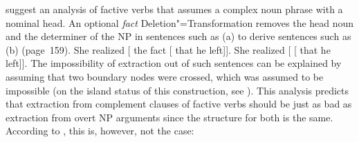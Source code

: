 \noindent
\citet{KK70a} suggest an analysis of factive verbs that assumes a complex noun phrase with a nominal head. An optional
\emph{fact} Deletion"=Transformation removes the head noun and the determiner of the
NP in sentences such as (a) to derive sentences such as (b) (page~159). 
\eal
\ex She realized [ the fact [ that he left]].
\ex She realized [ [ that he left]].
\zl
\addlines
The impossibility of extraction out of such sentences can be explained by assuming that two boundary
nodes were crossed, which was assumed to be impossible (on
the island status of this construction, see \citealp[Section~4]{KK70a}). This analysis predicts that
extraction from complement clauses of factive verbs should be just as bad as extraction from overt
NP arguments since the structure for both is the same.
According to \citet[]{AG2008a}, this is, however, not the case: 
\eal
{}
\zl

